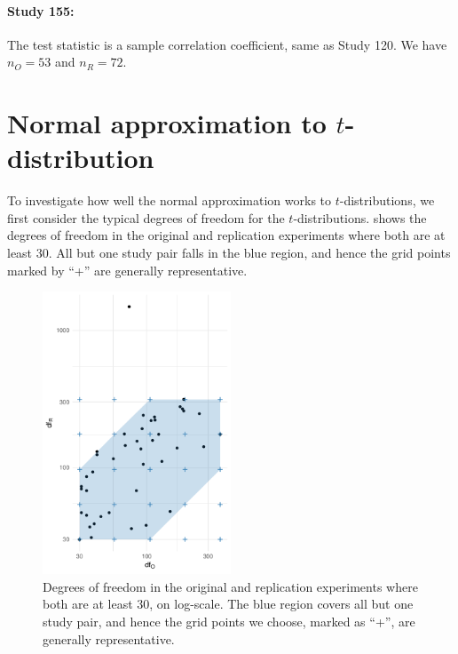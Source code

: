 \documentclass[11pt]{article}
\theoremstyle{definition}
\theoremstyle{custom}
\begin{document}
  \paragraph{Study 155: \citet{Moeller:2008by}}
  The test statistic is a sample correlation coefficient, same as Study 120. We have $n_O = 53$ and $n_R = 72$.

\section{Normal approximation to \texorpdfstring{$t$}{t}-distribution}

  To investigate how well the normal approximation works to $t$-distributions, we first consider the typical degrees of freedom for the $t$-distributions.  shows the degrees of freedom in the original and replication experiments where both are at least $30$. All but one study pair falls in the blue region, and hence the grid points marked by ``+'' are generally representative.
  \begin{figure}[htbp]
    \centering
    \includegraphics[width=0.5\textwidth]{df}
    \caption{Degrees of freedom in the original and replication experiments where both are at least $30$, on log-scale. The blue region covers all but one study pair, and hence the grid points we choose, marked as ``+'', are generally representative.}
  \label{fig:df}
  \end{figure}
\end{document}
